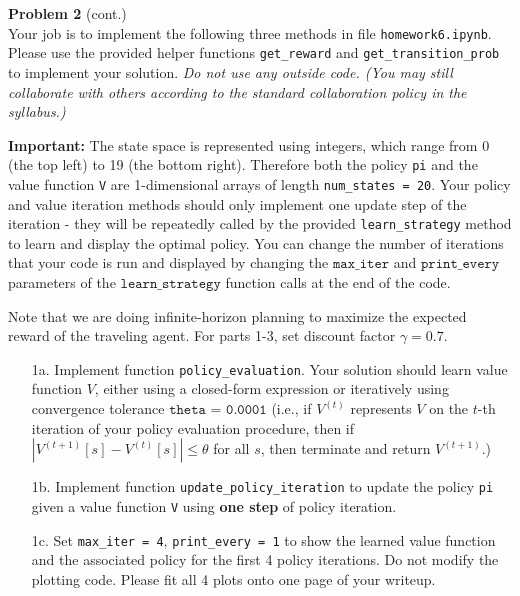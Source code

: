 \documentclass[submit]{harvardml}
\begin{document}
\begin{framed}
\textbf{Problem 2} (cont.)\\

Your job is to implement the following three methods in file \texttt{homework6.ipynb}. Please use the provided helper functions \texttt{get\_reward} and \texttt{get\_transition\_prob} to implement your solution. \emph{Do not use any outside code.  (You may still collaborate with others according to the standard collaboration policy in the syllabus.)}  

\textbf{Important: } The state space is represented using integers, which range from 0 (the top left) to 19 (the bottom right). Therefore both the policy \texttt{pi} and the value function \texttt{V} are 1-dimensional arrays of length \texttt{num\_states = 20}. Your policy and value iteration methods should only implement one update step of the iteration - they will be repeatedly called by the provided \texttt{learn\_strategy} method to learn and display the optimal policy. You can change the number of iterations that your code is run and displayed by changing the $\texttt{max\_iter}$ and $\texttt{print\_every}$ parameters of the $\texttt{learn\_strategy}$ function calls at the end of the code.

Note that we are doing infinite-horizon planning to maximize the expected reward of the traveling agent. For parts 1-3, set discount factor $\gamma = 0.7$.

\begin{itemize}
    \item[1a.]  Implement function \texttt{policy\_evaluation}.  Your
      solution should learn value function $V$, either using a closed-form expression or iteratively using
      convergence tolerance $\texttt{theta = 0.0001}$ (i.e., if
      $V^{(t)}$ represents $V$ on the $t$-th iteration of your policy
      evaluation procedure, then if $|V^{(t + 1)}[s] - V^{(t)}[s]|
      \leq \theta$ for all $s$, then terminate and return $V^{(t + 1)}$.)
    \item[1b.] Implement function \texttt{update\_policy\_iteration} to update the policy \texttt{pi} given a value function \texttt{V} using \textbf{one step} of policy iteration.
    
    \item[1c.] Set \texttt{max\_iter = 4}, \texttt{print\_every = 1} to show the learned value function and the associated policy for the first 4 policy iterations. Do not modify the plotting code. Please fit all 4 plots onto one page of your writeup.
    

\end{itemize}
\end{framed}
\end{document}
